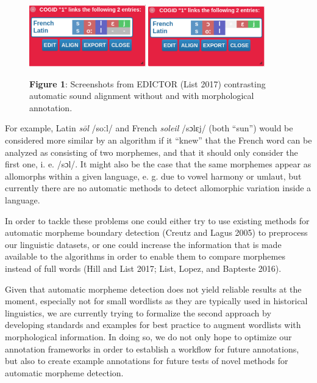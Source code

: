 \documentclass[
  a4paper,
  14pt,
  oneside,
  tablecaptionabove
]{scrbook}
\begin{document}
\begin{figure}[htb]
\centering
\includegraphics[width=0.45\textwidth]{images/graphic-1.png}
\includegraphics[width=0.45\textwidth]{images/graphic-2.png}
\caption*{\small \textbf{Figure 1}: Screenshots from EDICTOR (List 2017) contrasting
automatic sound alignment without and with morphological annotation.}
\end{figure}

For example, Latin \emph{sōl} /soːl/ and French \emph{soleil} /sɔlɛj/
(both \enquote{sun}) would be considered more similar by an algorithm if
it \enquote{knew} that the French word can be analyzed as consisting of
two morphemes, and that it should only consider the first one, i. e.
/sɔl/. It might also be the case that the same morphemes appear as
allomorphs within a given language, e. g. due to vowel harmony or
umlaut, but currently there are no automatic methods to detect
allomorphic variation inside a language.

In order to tackle these problems one could either try to use existing
methods for automatic morpheme boundary detection (Creutz and Lagus
2005) to preprocess our linguistic datasets, or one could increase the
information that is made available to the algorithms in order to enable
them to compare morphemes instead of full words (Hill and List 2017;
List, Lopez, and Bapteste 2016).

Given that automatic morpheme detection does not yield reliable results
at the moment, especially not for small wordlists as they are typically
used in historical linguistics, we are currently trying to formalize the
second approach by developing standards and examples for best practice
to augment wordlists with morphological information. In doing so, we do
not only hope to optimize our annotation frameworks in order to
establish a workflow for future annotations, but also to create example
annotations for future tests of novel methods for automatic morpheme
detection.
\end{document}
